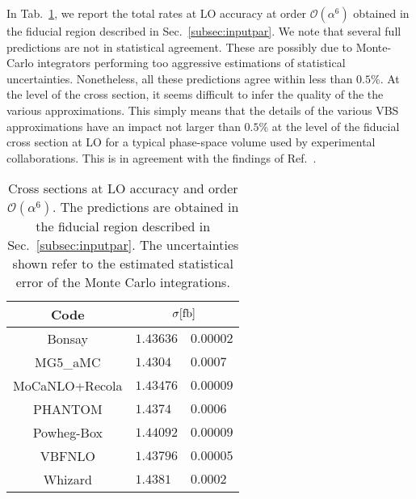 In Tab.~\ref{tab:wg1_LOrates}, we report the total rates at LO accuracy at order $\mathcal{O}(\alpha^6)$ obtained in the fiducial region described in Sec.~\ref{subsec:inputpar}.
We note that several full predictions are not in statistical agreement. These are possibly due to Monte-Carlo 
integrators performing too aggressive estimations of statistical uncertainties. Nonetheless, all these predictions agree within less than $0.5\%$.
At the level of the cross section, it seems difficult to infer the quality of the the various approximations.
This simply means that the details of the various VBS approximations have an impact not larger than $0.5\%$ at 
the level of the fiducial cross section at LO for a typical phase-space volume used by experimental collaborations.
This is in agreement with the findings of Ref.~\cite{Denner:2012dz,Oleari:2003tc}.

\begin{table}[h!]
    \centering
    \begin{tabular}{c|r@{ $\pm$ }l}
      Code  &  \multicolumn{2}{c}{$\sigma[\rm{fb}]$}  \\
        \hline
        \hline
        {\sc Bonsay}  &  $1.43636$ & $0.00002$ \\
        {\sc MG5\_aMC}&  $1.4304\phantom{0}$ & $0.0007$ \\
        {\sc MoCaNLO+Recola}  &  $1.43476$ & $0.00009$ \\
        {\sc PHANTOM} &  $1.4374\phantom{0}$ & $0.0006 $  \\
        {\sc Powheg-Box}  &  $1.44092$ & $0.00009$ \\
        {\sc VBFNLO}  &  $1.43796$ & $0.00005$ \\
        {\sc Whizard} &  $1.4381\phantom{0}$ & $0.0002 $
    \end{tabular}
    \caption{\label{tab:wg1_LOrates} Cross sections at LO accuracy and order $\mathcal{O}(\alpha^6)$.
    The predictions are obtained in the fiducial region described in Sec.~\ref{subsec:inputpar}.
    The uncertainties shown refer to the estimated statistical error of the Monte Carlo integrations.}
\end{table}
